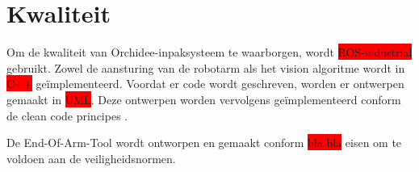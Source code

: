 \section{Kwaliteit}

Om de kwaliteit van Orchidee-inpaksysteem te waarborgen, wordt \colorbox{red}{ROS-industrial} gebruikt. 
Zowel de aansturing van de robotarm als het vision algoritme wordt in \colorbox{red}{C++} geïmplementeerd.
Voordat er code wordt geschreven, worden er ontwerpen gemaakt in \colorbox{red}{UML}.
Deze ontwerpen worden vervolgens geïmplementeerd conform de clean code principes \cite{CLEAN_CODE}.

De End-Of-Arm-Tool wordt ontworpen en gemaakt conform \colorbox{red}{bla bla} eisen om te voldoen aan de veiligheidsnormen.

\newpage